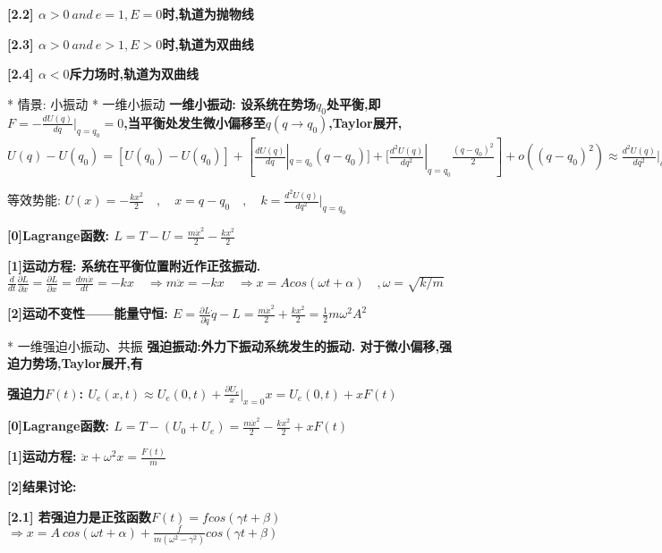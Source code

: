         \bf{[2.2] $\alpha > 0\ and\ e=1, E=0$时,轨道为抛物线}
        
        \bf{[2.3] $\alpha > 0\ and\ e>1, E>0$时,轨道为双曲线}
        
        \bf{[2.4] $\alpha < 0$斥力场时,轨道为双曲线}



    * 情景: 小振动
        * 一维小振动
            \bf{一维小振动}:
                设系统在势场$q_0$处平衡,即$F = -\frac{dU(q)}{dq}|_{q=q_0} = 0$,当平衡处发生微小偏移至$q(q\to q_0)$,Taylor展开,
                $U(q) - U(q_0) = [U(q_0) - U(q_0)] + [\frac{d U(q)}{dq}|_{q=q_0} (q - q_0)]+ [\frac{d^2 U(q)}{dq^2}|_{q=q_0} \frac{(q - q_0)^2}{2}] + o((q - q_0)^2) \approx \frac{d^2 U(q)}{dq^2}|_{q=q_0} \frac{(q - q_0)^2}{2}$
            
            等效势能:
            $U(x) = - \frac{k x^2}{2} \quad , \quad x = q-q_0 \quad ,\quad k = \frac{d^2 U(q)}{dq^2}|_{q=q_0}$
            
            \bf{[0]Lagrange函数}:
            $L = T - U = \frac{m \dot x^2}{2} - \frac{k x^2}{2}$
            
            \bf{[1]运动方程}: 系统在平衡位置附近作正弦振动.
            $\frac{d}{dt} \frac{\partial L}{\partial \dot x} = \frac{\partial L}{\partial x} = \frac{d m\dot x}{dt} = -kx \quad \Rightarrow m \ddot x = -kx \quad \Rightarrow x = A cos(\omega t + \alpha) \quad , \omega = \sqrt{k/m}$
            
            \bf{[2]运动不变性——能量守恒}:
            $E = \frac{\partial L}{\partial \dot q}\dot q - L = \frac{m \dot x^2}{2} + \frac{k x^2}{2} = \frac{1}{2} m \omega^2 A^2$


        * 一维强迫小振动、共振
            \bf{强迫振动}:外力下振动系统发生的振动. 对于微小偏移,强迫力势场,Taylor展开,有
            
            \bf{强迫力$F(t)$}:
                $U_e(x,t) \approx U_e(0,t) + \frac{\partial U_e}{x}|_{x=0}x = U_e(0,t) + xF(t)$
            
            \bf{[0]Lagrange函数}:
                $L = T - (U_0 + U_e) = \frac{m \dot x^2}{2} - \frac{k x^2}{2} + xF(t)$
            
            \bf{[1]运动方程}:
                $\ddot x + \omega^2 x = \frac{F(t)}{m}$
            
            \bf{[2]结果讨论}:
            
            \bf{[2.1]} 若强迫力是正弦函数$F(t) = f cos(\gamma t + \beta)$
                $\Rightarrow x = A\ cos(\omega t + \alpha) + \frac{f}{m(\omega^2 - \gamma^2)} cos(\gamma t + \beta)$
                
